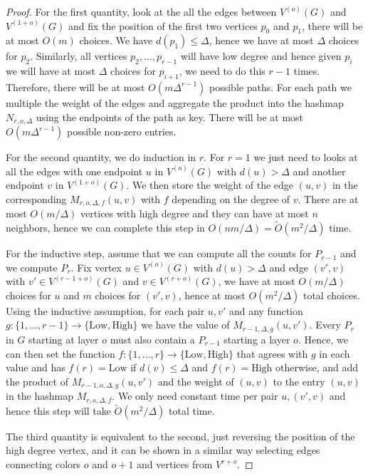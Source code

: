 \documentclass[a4paper,UKenglish,cleveref, autoref, numberwithinsect, thm-restate]{lipics-v2021}
\begin{document}
	\begin{proof}
		For the first quantity, look at the all the edges between $V^{(o)}(G)$ and $V^{(1+o)}(G)$ and fix the position of the first two vertices $p_0$ and $p_1$, there will be at most $O(m)$ choices. We have $d(p_1) \leq \Delta$, hence we have at most $\Delta$ choices for $p_2$. Similarly, all vertices $p_2,...,p_{r-1}$ will have low degree and hence given $p_i$ we will have at most $\Delta$ choices for $p_{i+1}$, we need to do this $r-1$ times. Therefore, there will be at most $O(m\Delta^{r-1})$ possible paths. For each path we multiple the weight of the edges and aggregate the product into the hashmap $N_{r,o,\Delta}$ using the endpoints of the path as key. There will be at most $O(m\Delta^{r-1})$ possible non-zero entries.
	
		For the second quantity, we do induction in $r$. For $r=1$ we just need to looks at all the edges with one endpoint $u$ in $V^{(o)}(G)$ with $d(u)>\Delta$ and another endpoint $v$ in $V^{(1+o)}(G)$. We then store the weight of the edge $(u,v)$ in the corresponding $M_{r,o,\Delta,f}(u,v)$ with $f$ depending on the degree of $v$. There are at most $O(m/\Delta)$ vertices with high degree and they can have at most $n$ neighbors, hence we can complete this step in $O(nm/\Delta) = \tilde{O}(m^2/\Delta)$ time.
		
		For the inductive step, assume that we can compute all the counts for $P_{r-1}$ and we compute $P_r$. Fix vertex $u \in V^{(o)}(G)$ with $d(u)>\Delta$ and edge $(v',v)$ with $v' \in V^{(r-1+o)}(G)$ and $v \in V^{(r+o)}(G)$, we have at most $O(m/\Delta)$ choices for $u$ and $m$ choices for $(v',v)$, hence at most $O(m^2/\Delta)$ total choices. Using the inductive assumption, for each pair $u,v'$ and any function $g : \{1,...,r-1\} \to \{\text{Low},\text{High}\}$ we have the value of $M_{r-1,\Delta,g}(u,v')$. Every $P_r$ in $G$ starting at layer $o$ must also contain a  $P_{r-1}$ starting a layer $o$. Hence, we can then set the function $f :\{1,...,r\} \to \{\text{Low},\text{High}\}$ that agrees with $g$ in each value and has $f(r) = \text{Low}$ if $d(v) \leq \Delta$ and $f(r) = \text{High}$ otherwise, and add the product of $M_{r-1,o,\Delta,g}(u,v')$  and the weight of $(u,v)$ to the entry $(u,v)$ in the hashmap $M_{r,o,\Delta,f}$. We only need constant time per pair $u,(v',v)$ and hence this step will take $\tilde{O}(m^2/\Delta)$ total time.
		
		The third quantity is equivalent to the second, just reversing the position of the high degree vertex, and it can be shown in a similar way selecting edges connecting colors $o$ and $o+1$ and vertices from $V^{r+o}$.
	\end{proof}
	
\end{document}
